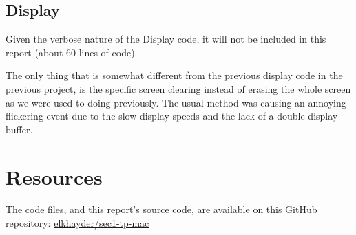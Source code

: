 \documentclass{article}
\begin{document}
\subsection{Display}

Given the verbose nature of the Display code, it will not be included in this report (about 60 lines of code).

The only thing that is somewhat different from the previous display code in the previous project, is the specific screen clearing instead of erasing the whole screen as we were used to doing previously. The usual method was causing an annoying flickering event due to the slow display speeds and the lack of a double display buffer.

\section*{Resources}
The code files, and this report's source code, are available on this GitHub repository: \href{https://github.com/elkhayder/sec1-tp-mac}{elkhayder/sec1-tp-mac} 
\end{document}
